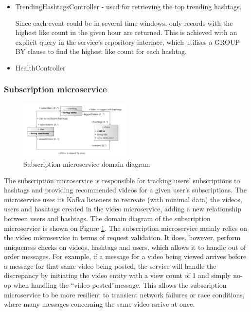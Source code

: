 \documentclass[parskip=full]{article}
\begin{document}
    \begin{itemize}
        \item TrendingHashtagsController - used for retrieving the top trending hashtags.

        Since each event could be in several time windows, only records with the highest like count in the given hour are returned.
        This is achieved with an explicit query in the service's repository interface, which utilises a GROUP BY clause to find the highest like count for each hashtag.
        \item HealthController
    \end{itemize}
    \pagebreak
    \subsubsection{Subscription microservice}
    \begin{figure}
        \includegraphics[width=0.5\textwidth]{sm-domain-diagram}
        \caption{Subscription microservice domain diagram}
        \label{fig:smDomain}
        \vspace{-1em}
    \end{figure}
    The subscription microservice is responsible for tracking users' subscriptions to hashtags and providing recommended videos for a given user's subscriptions.
    The microservice uses its Kafka listeners to recreate (with minimal data) the videos, users and hashtags created in the video
    microservice, adding a new relationship between users and hashtags.
    The domain diagram of the subscription microservice is shown on Figure \ref{fig:smDomain}.
    The subscription microservice mainly relies on the video microservice in terms of request validation.
    It does, however, perform uniqueness checks on videos, hashtags and users, which allows it to handle out of order messages.
    For example, if a message for a video being viewed arrives before a message for that same video being posted, the service will handle the discrepancy by initiating the video entity with a view count of 1 and simply no-op when handling the ``video-posted''message.
    This allows the subscription microservice to be more resilient to transient network failures or race conditions, where many messages concerning the same video arrive at once.
\end{document}
